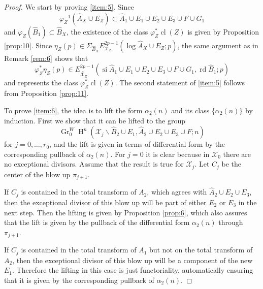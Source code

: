 \documentclass[11pt,a4paper]{amsart}
\newcommand{\caX}{\mathcal{X}}
\DeclareMathOperator {\Gr} {Gr}
\DeclareMathOperator{\si}{si}
\DeclareMathOperator{\rd}{rd}
\DeclareMathOperator {\cl}{cl}
\DeclareMathOperator{\rH}{H}
\numberwithin{equation}{section}
\theoremstyle{plain}
\theoremstyle{definition}
\begin{document}
\begin{proof}
  We start by proving \ref{item:5}. Since
  \begin{displaymath}
    \varphi_Z^{-1}(\widehat A_X\cup E_Z)\subset \widehat A_1\cup
    E_1\cup E_2\cup E_3\cup F\cup G_1 
  \end{displaymath}
  and $\varphi_Z(\widehat B_1)\subset \widehat B_X$, the existence of
  the class $\varphi_{Z}^{\ast}\cl(Z)$ is given by Proposition
  \ref{prop:10}. Since $\eta_{Z}(p)\in \Sigma _{\widehat{B}_X}E^{2p-1}_{\caX_{Z}}(\log
  \widehat{A}_X\cup E_{Z};p)$, the same argument as in Remark
  \ref{rem:6} shows that
  \begin{displaymath}
    \varphi_{Z}^\ast\eta_Z(p) \in E^{2p-1}_{\widetilde {\caX_{Z}}}(\si
    \widehat A_1\cup E_1\cup E_2\cup E_3\cup F\cup G_1,\rd \widehat B_1;p)
  \end{displaymath}
  and represents the class $\varphi_Z^\ast\cl(Z)$. The second
  statement of \ref{item:5} follows from Proposition \ref{prop:11}. 
  
  To prove \ref{item:6}, the idea is to lift the form $\alpha _{2}(n)$
  and its class $\{\alpha _2(n)\}$ by
  induction.
First we show that it can be lifted to the group
   \begin{displaymath}
     \Gr_{0}^{W}\rH^{n}(\caX_{j}\smallsetminus \widehat B_{2}\cup
     E_{1}, \widehat A_{2}\cup E_{2}\cup E_{3}\cup F; n)
   \end{displaymath}
   for $j=0,\dots, r_{0}$, and the lift is given in terms of
   differential form by the corresponding pullback of
   $\alpha_{2}(n)$. For $j=0$ it is clear because in $\caX_{0}$ 
   there are no exceptional divisors. Assume that the result is true
   for $\caX_{j}$. Let $C_{j}$ be the center of the blow up $\pi
   _{j+1}$.

   If $C_{j}$ is contained in the total transform of $A_{2}$,
   which agrees  with $\widehat A_{2}\cup E_{2}\cup E_{3}$, then the
   exceptional divisor of this blow up will be part of either $E_{2}$
   or $E_{3}$ in the next step. Then the lifting is given by Proposition
   \ref{prop:6}, which also assures that the lift is given by the
   pullback of the differential form $\alpha_{2}(n)$
   through $\pi_{j+1}$.

   If $C_{j}$ is contained in the total transform of
   $A_{1}$ but not on the total transform of $A_{2}$, then the
   exceptional divisor of this blow up will be a component of the new
   $E_{1}$. Therefore the lifting in this case is just functoriality,
   automatically ensuring that it is given by the corresponding
   pullback of $\alpha_{2}(n)$. 


\end{proof}
\end{document}
